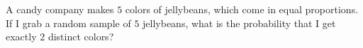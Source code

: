 A candy company makes $5$ colors of jellybeans, which come in equal proportions. If I grab a random sample of $5$ jellybeans, what is the probability that I get exactly $2$ distinct colors?